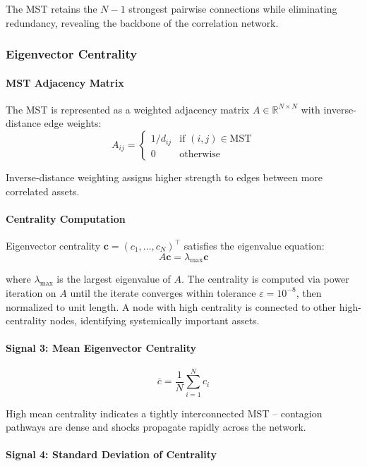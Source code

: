 The MST retains the $N - 1$ strongest pairwise connections while eliminating redundancy, revealing the backbone of the correlation network.

\subsubsection{Eigenvector Centrality}

\paragraph{MST Adjacency Matrix}

The MST is represented as a weighted adjacency matrix $A \in \mathbb{R}^{N \times N}$ with inverse-distance edge weights:
\[
A_{ij} = \begin{cases}
1 / d_{ij} & \text{if } (i, j) \in \text{MST} \\
0 & \text{otherwise}
\end{cases}
\]

Inverse-distance weighting assigns higher strength to edges between more correlated assets.

\paragraph{Centrality Computation}

Eigenvector centrality $\mathbf{c} = (c_1, \ldots, c_N)^\top$ satisfies the eigenvalue equation:
\[
A \mathbf{c} = \lambda_{\max} \mathbf{c}
\]

where $\lambda_{\max}$ is the largest eigenvalue of $A$. The centrality is computed via power iteration on $A$ until the iterate converges within tolerance $\varepsilon = 10^{-8}$, then normalized to unit length. A node with high centrality is connected to other high-centrality nodes, identifying systemically important assets.

\paragraph{Signal 3: Mean Eigenvector Centrality}

\[
\bar{c} = \frac{1}{N} \sum_{i=1}^{N} c_i
\]

High mean centrality indicates a tightly interconnected MST -- contagion pathways are dense and shocks propagate rapidly across the network.

\paragraph{Signal 4: Standard Deviation of Centrality}

